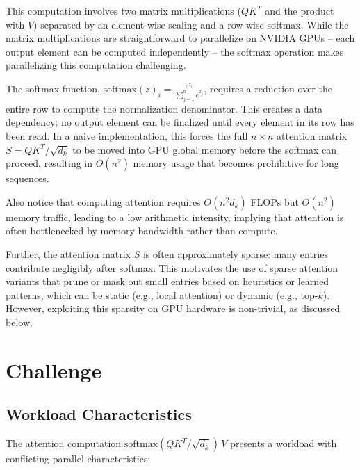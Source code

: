 \documentclass[11pt]{article}
\begin{document}
This computation involves two matrix multiplications ($QK^T$ and the product with $V$) separated by an element-wise scaling and a row-wise softmax. While the matrix multiplications are straightforward to parallelize on NVIDIA GPUs -- each output element can be computed independently -- the softmax operation makes parallelizing this computation challenging.

The softmax function, $\displaystyle \text{softmax}(z)_i = \frac{e^{z_i}}{\sum_{j=1}^{n} e^{z_j}}$, requires a reduction over the entire row to compute the normalization denominator. This creates a data dependency: no output element can be finalized until every element in its row has been read. In a naive implementation, this forces the full $n \times n$ attention matrix $S = QK^T / \sqrt{d_k}$ to be moved into GPU global memory before the softmax can proceed, resulting in $O(n^2)$ memory usage that becomes prohibitive for long sequences.

Also notice that computing attention requires $O(n^2 d_k)$ FLOPs but $O(n^2)$ memory traffic, leading to a low arithmetic intensity, implying that attention is often bottlenecked by memory bandwidth rather than compute.

Further, the attention matrix $S$ is often approximately sparse: many entries contribute negligibly after softmax. This motivates the use of sparse attention variants that prune or mask out small entries based on heuristics or learned patterns, which can be static (e.g., local attention) or dynamic (e.g., top-$k$). However, exploiting this sparsity on GPU hardware is non-trivial, as discussed below.


\section*{Challenge}

\subsection*{Workload Characteristics}

The attention computation $\text{softmax}(QK^T / \sqrt{d_k})\, V$ presents a workload with conflicting parallel characteristics:
\end{document}
